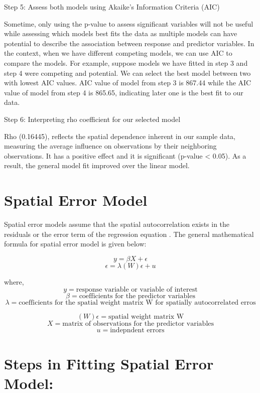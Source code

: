 \documentclass[
]{book}
\begin{document}
Step 5: Assess both models using Akaike's Information Criteria (AIC)

Sometime, only using the p-value to assess significant variables will not be useful while assessing which models best fits the data as multiple models can have potential to describe the association between response and predictor variables. In the context, when we have different competing models, we can use AIC \citep[for details see,][]{akaike_information_1973} to compare the models. For example, suppose models we have fitted in step 3 and step 4 were competing and potential. We can select the best model between two with lowest AIC values. AIC value of model from step 3 is 867.44 while the AIC value of model from step 4 is 865.65, indicating later one is the best fit to our data.

Step 6: Interpreting rho coefficient for our selected model

Rho (0.16445), reflects the spatial dependence inherent in our sample data, measuring the average influence on observations by their neighboring observations. It has a positive effect and it is significant (p-value \textless{} 0.05). As a result, the general model fit improved over the linear model.

\hypertarget{spatial-error-model}{%
\section{Spatial Error Model}\label{spatial-error-model}}

Spatial error models assume that the spatial autocorrelation exists in the residuals or the error term of the regression equation \citep{anselin_spatial_1998}. The general mathematical formula for spatial error model is given below:

\[ y=\beta X + \epsilon\]
\[\epsilon= \lambda (W)\epsilon+ u\]

where, \[y= \text{response variable or variable of interest}\]
\[\beta= \text{coefficients for the predictor variables}\]
\[\lambda= \text{coefficients for the spatial weight matrix W for spatially autocorrelated erros}\]

\[(W)\epsilon=\text{spatial weight matrix W}\]
\[X=\text{matrix of observations for the predictor variables}\]
\[u=\text{indepndent errors}\]

\hypertarget{steps-in-fitting-spatial-error-model}{%
\section{Steps in Fitting Spatial Error Model:}\label{steps-in-fitting-spatial-error-model}}
\end{document}
